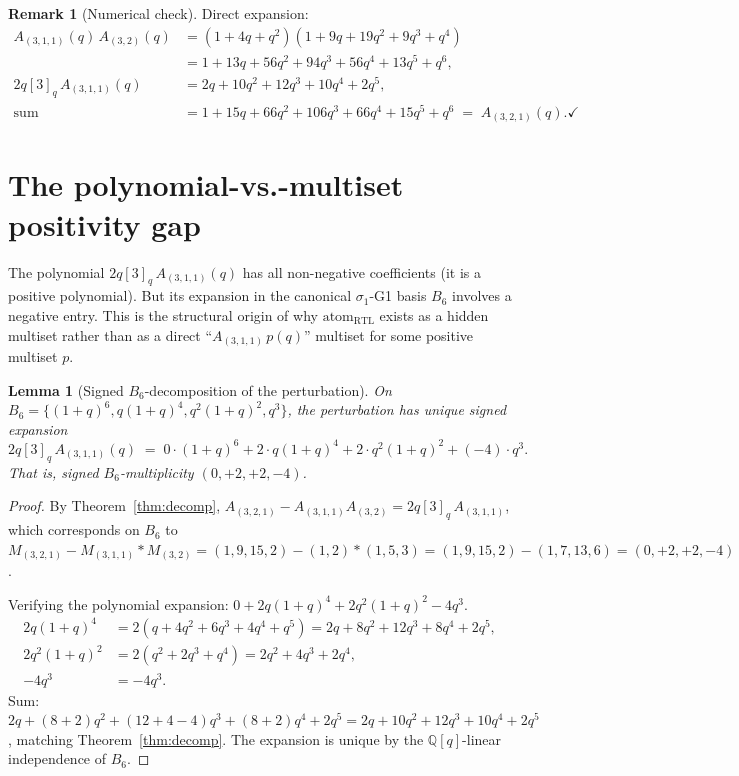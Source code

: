 \documentclass[11pt]{article}
\newtheorem{lemma}[theorem]{Lemma}
\theoremstyle{definition}
\newtheorem{remark}[theorem]{Remark}
\begin{document}
\begin{remark}[Numerical check]\label{rem:check}
Direct expansion:
\begin{align*}
A_{(3,1,1)}(q)\, A_{(3,2)}(q) &= (1 + 4q + q^2)(1 + 9q + 19q^2 + 9q^3 + q^4) \\
&= 1 + 13q + 56q^2 + 94q^3 + 56q^4 + 13q^5 + q^6,\\
2q [3]_q\, A_{(3,1,1)}(q) &= 2q + 10q^2 + 12q^3 + 10q^4 + 2q^5,\\
\text{sum} &= 1 + 15q + 66q^2 + 106q^3 + 66q^4 + 15q^5 + q^6 \;=\; A_{(3,2,1)}(q). \checkmark
\end{align*}
\end{remark}

\section{The polynomial-vs.-multiset positivity gap}

The polynomial $2q[3]_q\, A_{(3,1,1)}(q)$ has all non-negative coefficients (it is a
positive polynomial). But its expansion in the canonical $\sigma_1$-G1 basis
$B_6$ involves a negative entry. This is the structural origin of why
$\mathrm{atom}_{\mathrm{RTL}}$ exists as a hidden multiset rather than as a
direct ``$A_{(3,1,1)}\, p(q)$'' multiset for some positive multiset $p$.

\begin{lemma}[Signed $B_6$-decomposition of the perturbation]\label{lem:perturb-Bdec}
On $B_6 = \{(1+q)^6, q(1+q)^4, q^2(1+q)^2, q^3\}$, the perturbation has unique signed expansion
\[
2q [3]_q\, A_{(3,1,1)}(q) \;=\; 0 \cdot (1+q)^6 + 2 \cdot q(1+q)^4 + 2 \cdot q^2(1+q)^2 + (-4) \cdot q^3.
\]
That is, signed $B_6$-multiplicity $(0, +2, +2, -4)$.
\end{lemma}

\begin{proof}
By Theorem~\ref{thm:decomp}, $A_{(3,2,1)} - A_{(3,1,1)} A_{(3,2)} = 2q[3]_q\, A_{(3,1,1)}$,
which corresponds on $B_6$ to $M_{(3,2,1)} - M_{(3,1,1)} \ast M_{(3,2)} = (1,9,15,2) - (1,2)\ast(1,5,3) = (1,9,15,2) - (1, 7, 13, 6) = (0, +2, +2, -4)$.

Verifying the polynomial expansion: $0 + 2 q(1+q)^4 + 2 q^2 (1+q)^2 - 4 q^3$.
\begin{align*}
2 q (1+q)^4 &= 2(q + 4q^2 + 6q^3 + 4q^4 + q^5) = 2q + 8q^2 + 12 q^3 + 8q^4 + 2q^5,\\
2 q^2 (1+q)^2 &= 2(q^2 + 2q^3 + q^4) = 2q^2 + 4q^3 + 2q^4,\\
-4 q^3 &= -4 q^3.
\end{align*}
Sum: $2q + (8+2)q^2 + (12+4-4)q^3 + (8+2)q^4 + 2q^5 = 2q + 10q^2 + 12q^3 + 10q^4 + 2q^5$, matching Theorem~\ref{thm:decomp}. The expansion is unique by the $\mathbb{Q}[q]$-linear independence of $B_6$.
\end{proof}
\end{document}
